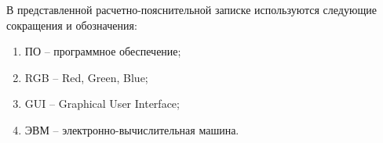
В представленной расчетно-пояснительной записке используются следующие сокращения и обозначения:
\begin{enumerate}
    \item ПО -- программное обеспечение;
    \item RGB -- Red, Green, Blue;
    \item GUI -- Graphical User Interface;
    \item ЭВМ -- электронно-вычислительная машина.
\end{enumerate}
